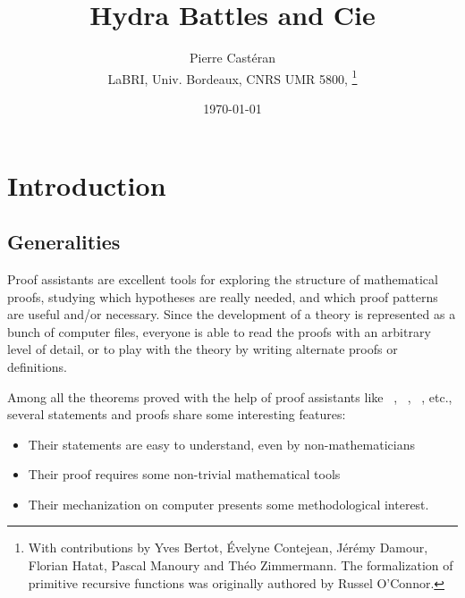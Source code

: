 \documentclass[a4paper]{book}
\author{Pierre Castéran\\ LaBRI, Univ. Bordeaux, CNRS UMR 5800, \thanks{With contributions by Yves Bertot, \'Evelyne Contejean,  Jérémy Damour, Florian Hatat, Pascal Manoury and Théo Zimmermann. The formalization of primitive recursive functions was originally authored by 
Russel O'Connor\cite{OConnor05}.}}
\date{\today}
\title{Hydra Battles and Cie}
\begin{document}
\maketitle
















\tableofcontents
 


\chapter{Introduction}

  

\vspace{16pt}

\section{Generalities}

Proof assistants are excellent tools for exploring the structure of mathematical proofs,
studying  which hypotheses are really needed, and which proof patterns are useful and/or
necessary. Since the development of a theory is represented as a bunch of computer files,
everyone is able to read the proofs with an arbitrary level of detail, or to play with the theory by writing alternate proofs or definitions.


Among all the theorems proved with the help of proof assistants like \coq{}~\cite{Coq,BC04}, \hol{}~\cite{HOL}, \isabelle{}~\cite{isabelle},  etc.,
several statements and proofs  share some interesting features:
\begin{itemize}
\item Their statements are easy to understand, even by non-mathematicians
\item Their proof requires some non-trivial mathematical tools
\item Their mechanization on computer presents some methodological interest.
\end{itemize}
\end{document}
